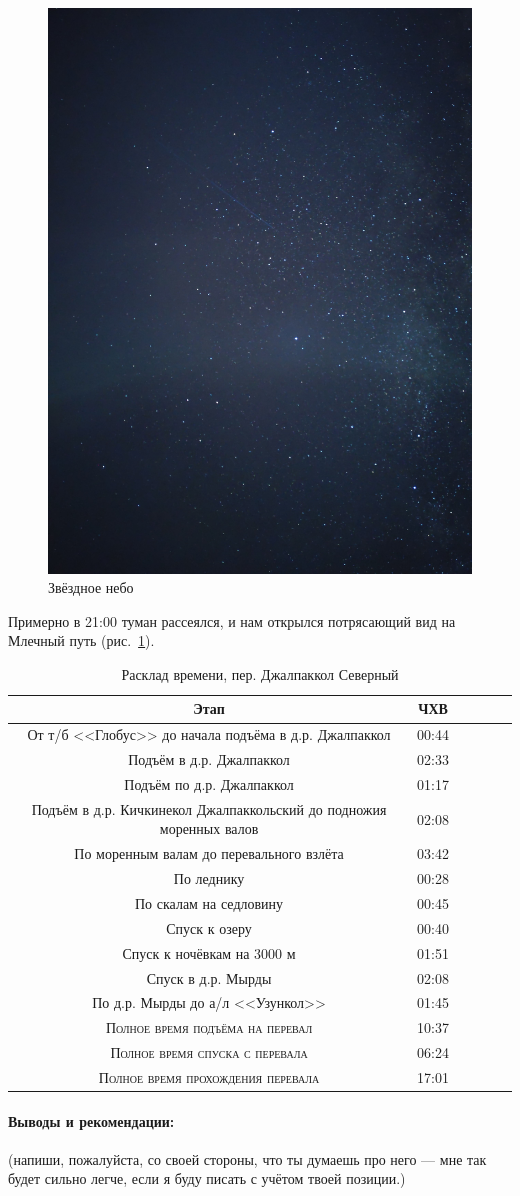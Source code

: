 \begin{figure}[h!]	
	\centering
	\includegraphics[angle=0, width=0.7\linewidth]{../pics/IMG_20240823_205116}
	\caption{Звёздное небо}
	\label{fig:IMG_20240823_205116}
\end{figure}
 
Примерно в 21:00 туман рассеялся, и нам открылся потрясающий вид на Млечный путь (рис.~\ref{fig:IMG_20240823_205116}).
 
 \begin{table}[h!]
 	\centering
 	\begin{tabular}{|c|c|c|c|c|c|} 
 		\hline 
 		Этап & ЧХВ \\ 	
 		\hline 
 		От т/б <<Глобус>> до начала подъёма в д.р. Джалпаккол  & 00:44 \\
 		Подъём в д.р. Джалпаккол  & 02:33 \\
 		Подъём по д.р. Джалпаккол & 01:17\\ 
 		Подъём в д.р. Кичкинекол Джалпаккольский до подножия моренных валов & 02:08\\ 
 		По моренным валам до перевального взлёта & 03:42\\ 
 		По леднику & 00:28 \\
 		По скалам на седловину & 00:45 \\
 		Спуск к озеру & 00:40 \\
 		Спуск к ночёвкам на 3000 м & 01:51 \\
 		Спуск в д.р. Мырды & 02:08 \\
 		По д.р. Мырды до а/л <<Узункол>>& 01:45 \\
 		\hline
 		\textsc{Полное время подъёма на перевал  }& 10:37\\
 		\textsc{Полное время спуска с перевала }& 06:24 \\
 		\textsc{	Полное время прохождения перевала }& 17:01 \\
 		\hline
 	\end{tabular}
 	\caption{Расклад времени, пер. Джалпаккол Северный}
 \end{table}
 
 \paragraph{Выводы и рекомендации:} \alert{(напиши, пожалуйста, со своей стороны, что ты думаешь про него --- мне так будет сильно легче, если я буду писать с учётом твоей позиции.)}
 
\clearpage
